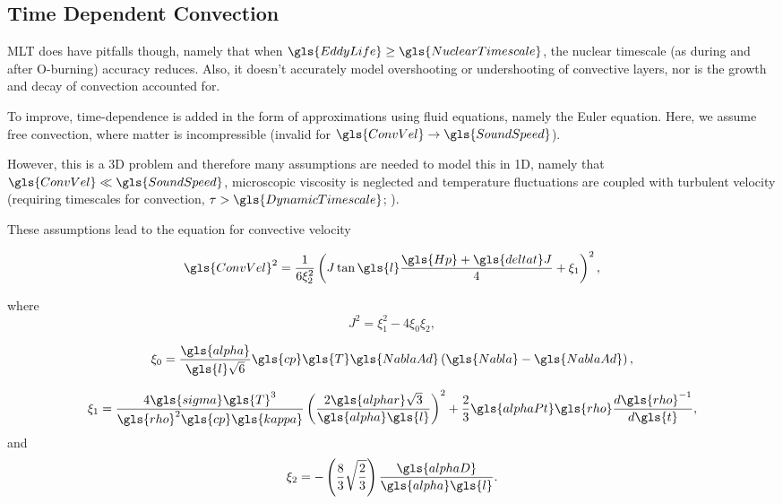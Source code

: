 \subsection{Time Dependent Convection}\label{sec:TDC}
\gls{MLT} does have pitfalls though, namely that when $\gls{EddyLife} \ge \gls{NuclearTimescale}$, the nuclear timescale (as during and after O-burning) accuracy reduces. Also, it doesn't accurately model overshooting or undershooting of convective layers, nor is the growth and decay of convection accounted for.

To improve, time-dependence is added in the form of approximations using fluid equations, namely the Euler equation. Here, we assume free convection, where matter is incompressible (invalid for $\gls{ConvVel} \rightarrow \gls{SoundSpeed}$).

However, this is a 3D problem and therefore many assumptions are needed to model this in 1D, namely that $\gls{ConvVel}\ll \gls{SoundSpeed}$, microscopic viscosity is neglected and temperature fluctuations are coupled with turbulent velocity (requiring timescales for convection, $\tau > \gls{DynamicTimescale}$; \citealp{Weiss04}). 

These assumptions lead to the equation for convective velocity 

\begin{equation}
\gls{ConvVel}^2=\frac{1}{6 \xi_2^2}\left(J \tan \gls{l} \frac{\gls{Hp}+\gls{deltat} J}{4} +\xi_1\right)^2,
\label{eq:TDCVel}
\end{equation}

where 
\begin{equation}
    J^2=\xi_1^2-4\xi_0\xi_2,
\end{equation}

\begin{equation}
    \xi_0=\frac{\gls{alpha}}{\gls{l}\sqrt{6}} \gls{cp}\gls{T}\gls{NablaAd}\left(\gls{Nabla} - \gls{NablaAd}\right),
\end{equation}

\begin{equation}
    \xi_1=\frac{4\gls{sigma} \gls{T}^3}{\gls{rho}^2 \gls{cp} \gls{kappa}}\left(\frac{2\gls{alphar} \sqrt{3}}{\gls{alpha} \gls{l}}\right)^2 +\frac{2}{3}\gls{alphaPt}\gls{rho}\frac{d\gls{rho}^{-1}}{d \gls{t}},
\end{equation}
and
\begin{equation}
    \xi_2=-\left(\frac{8}{3}\sqrt{\frac{2}{3}}\right)\frac{\gls{alphaD}}{\gls{alpha} \gls{l}}.
\end{equation}


